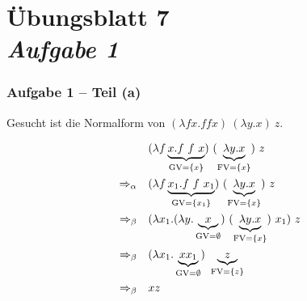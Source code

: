 \documentclass{beamer}
\DeclareMathOperator{\GV}{GV}
\DeclareMathOperator{\FV}{FV}
\begin{document}
\section{Übungsblatt 7 \\ \textit{\normalsize Aufgabe 1}}


\begin{frame} \frametitle{Aufgabe 1 -- Teil (a)}
	\small
	Gesucht ist die Normalform von $(\lambda f x . f f x) \ (\lambda y . x) \ z$. \pause
	
	\begin{align*}
		&(\lambda f \underbrace{x . f \ f \ x}_{\GV = \menge{x}}) \ (\underbrace{\lambda y . x}_{\FV = \menge{x}}) \ z	\\ 
		\Rightarrow_\alpha \quad
		& (\lambda f \underbrace{x_1 . f \ f \ x_1}_{\GV = \menge{x_1}}) \ (\underbrace{\lambda y . x}_{\FV = \menge{x}}) \ z
		\\
		\Rightarrow_\beta \quad
		& (\lambda x_1 . (\lambda y . \underbrace{x}_{\GV = \emptyset}) \ (\underbrace{\lambda y . x}_{\FV = \menge{x}}) \ x_1) \ z
		\\
		\Rightarrow_\beta \quad
		& (\lambda x_1 . \underbrace{x x_1}_{\GV = \emptyset}) \ \underbrace{z}_{\FV = \menge{z}}
		\\
		\Rightarrow_\beta \quad
		& xz
		\\
	\end{align*}
\end{frame}
\end{document}
